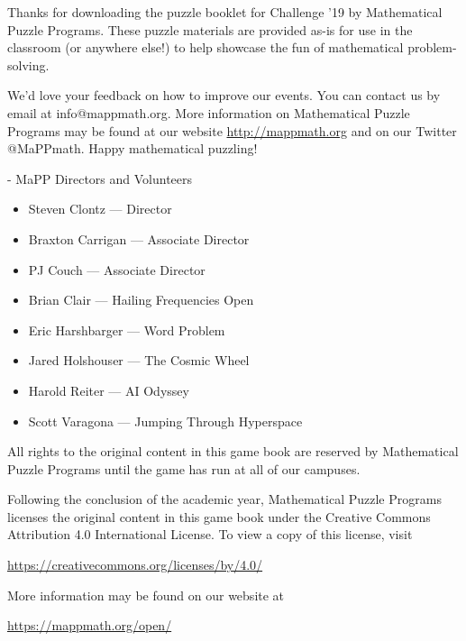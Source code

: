 Thanks for downloading the puzzle booklet for Challenge '19 by
Mathematical Puzzle Programs.  These puzzle materials are provided as-is for use
in the classroom (or anywhere else!)  to help showcase the fun of mathematical
problem-solving.

We'd love your feedback on how to improve our events. 
You can contact us by email at info@mappmath.org.
More information on Mathematical Puzzle Programs may be found at our website
\url{http://mappmath.org} and on our Twitter @MaPPmath. Happy mathematical puzzling!

- MaPP Directors and Volunteers

  \begin{itemize}
    \item Steven Clontz --- Director
    \item Braxton Carrigan --- Associate Director
    \item PJ Couch --- Associate Director
  \end{itemize}

  \begin{itemize}
    \item Brian Clair --- Hailing Frequencies Open
    \item Eric Harshbarger --- Word Problem
    \item Jared Holshouser --- The Cosmic Wheel
    \item Harold Reiter --- AI Odyssey
    \item Scott Varagona --- Jumping Through Hyperspace
  \end{itemize}


All rights to the original content in this game book are reserved by
Mathematical Puzzle Programs until the game has run at all of our campuses.

Following the conclusion of the academic year,
Mathematical Puzzle Programs licenses the original content in this game book
under the Creative Commons Attribution 4.0
International License. To view a copy of this license, visit

\begin{center}
  \url{https://creativecommons.org/licenses/by/4.0/}
\end{center}

More information may be found on our website at

\begin{center}
  \url{https://mappmath.org/open/}
\end{center}

